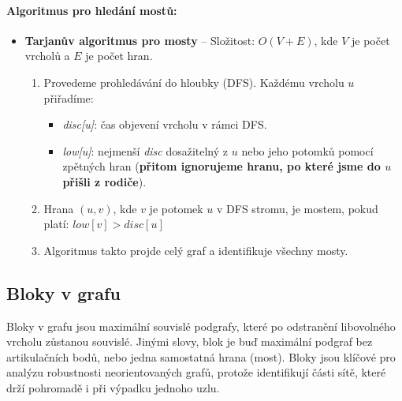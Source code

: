 \paragraph*{Algoritmus pro hledání mostů:}
\begin{itemize}
\item \textbf{Tarjanův algoritmus pro mosty} -- Složitost: $O(V + E)$, kde $V$ je počet vrcholů a $E$ je počet hran.
\begin{enumerate}
    \item Provedeme prohledávání do hloubky (DFS). Každému vrcholu $u$ přiřadíme: 
    \begin{itemize}
        \item \textit{disc[u]}: čas objevení vrcholu v rámci DFS.
        \item \textit{low[u]}: nejmenší \textit{disc} dosažitelný z $u$ nebo jeho potomků pomocí zpětných hran (\textbf{přitom ignorujeme hranu, po které jsme do $u$ přišli z rodiče}).
    \end{itemize}
    \item Hrana $(u, v)$, kde $v$ je potomek $u$ v DFS stromu, je mostem, pokud platí:
    $low[v] > disc[u]$
    \item Algoritmus takto projde celý graf a identifikuje všechny mosty.
\end{enumerate}
\end{itemize}

\subsection{Bloky v grafu}
Bloky v grafu jsou maximální souvislé podgrafy, které po odstranění libovolného 
vrcholu zůstanou souvislé. Jinými slovy, blok je buď maximální podgraf bez 
artikulačních bodů, nebo jedna samostatná hrana (most). Bloky jsou klíčové pro 
analýzu robustnosti neorientovaných grafů, protože identifikují části sítě, které 
drží pohromadě i při výpadku jednoho uzlu.

